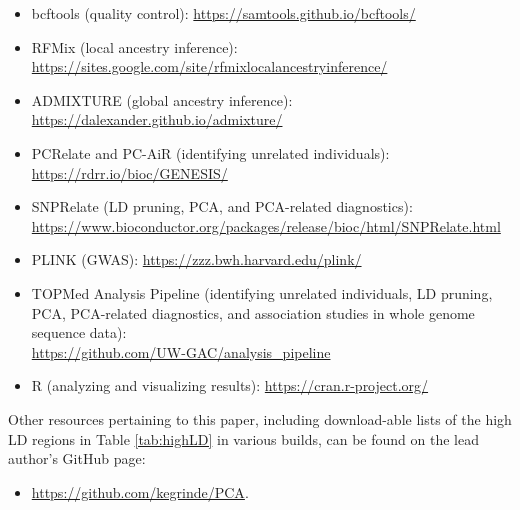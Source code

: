 \documentclass[12pt]{article}
\newcommand{\edit}[1]{{\color{red}{#1}}}
\begin{document}
\begin{itemize}
\item bcftools \citep{bcftools} (quality control): \href{https://samtools.github.io/bcftools/}{https://samtools.github.io/bcftools/}
\item RFMix \citep{rfmix} (local ancestry inference):  \href{https://sites.google.com/site/rfmixlocalancestryinference/}{https://sites.google.com/site/rfmixlocalancestryinference/}
\item ADMIXTURE \citep{admixture} (global ancestry inference): \href{https://dalexander.github.io/admixture/}{https://dalexander.github.io/admixture/}
\item PCRelate \citep{conomos2016related} and PC-AiR \citep{conomos2015}
 (identifying unrelated individuals): \href{https://rdrr.io/bioc/GENESIS/}{https://rdrr.io/bioc/GENESIS/}
\item SNPRelate \citep{snprelate} (LD pruning, PCA, and PCA-related diagnostics): \\ \href{https://www.bioconductor.org/packages/release/bioc/html/SNPRelate.html}{https://www.bioconductor.org/packages/release/bioc/html/SNPRelate.html} 
\item PLINK \citep{plink} (GWAS): \href{https://zzz.bwh.harvard.edu/plink/}{https://zzz.bwh.harvard.edu/plink/}
\item TOPMed Analysis Pipeline (identifying unrelated individuals, LD pruning, PCA,  PCA-related diagnostics, and association studies in whole genome sequence data): \\ \href{https://github.com/UW-GAC/analysis_pipeline}{https://github.com/UW-GAC/analysis\_pipeline}
\item R (analyzing and visualizing results): \href{https://cran.r-project.org/}{https://cran.r-project.org/}
\end{itemize}

\noindent Other resources pertaining to this paper, including download-able lists of the high LD regions in Table \ref{tab:highLD} in various builds, can be found on the lead author's GitHub page: 
\begin{itemize}
\item \href{https://github.com/kegrinde/PCA}{https://github.com/kegrinde/PCA}.
\end{itemize}

\noindent \edit{The GitHub repository is currently private, but I'll make it public once the paper is submitted. If anyone would like to see the repository before I submit, let me know and I'll add you as a collaborator.}
\end{document}
